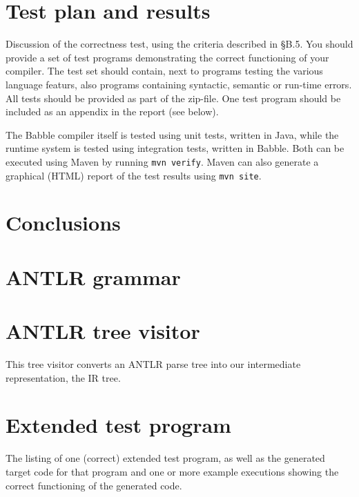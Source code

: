 \documentclass[a4paper]{article}
\begin{document}
\section{Test plan and results}
Discussion of the correctness test, using the criteria described in §B.5. You
should provide a set of test programs demonstrating the correct functioning of your compiler. The test
set should contain, next to programs testing the various language featurs, also programs containing
syntactic, semantic or run-time errors.
All tests should be provided as part of the zip-file. One test program should be included as an appendix
in the report (see below).


The Babble compiler itself is tested using unit tests, written in Java, while the runtime system is tested using integration tests, written in Babble.
Both can be executed using Maven by running \texttt{mvn verify}.
Maven can also generate a graphical (HTML) report of the test results using \texttt{mvn site}.


\section{Conclusions}

\clearpage

\begin{appendices}

\label{grammar}
\section{ANTLR grammar}



\label{visitor}
\section{ANTLR tree visitor}
This tree visitor converts an ANTLR parse tree into our intermediate representation, the IR tree.



\section{Extended test program}
The listing of one (correct) extended test program, as well as the generated
target code for that program and one or more example executions showing the correct functioning of the generated code.

\end{appendices}
\end{document}
